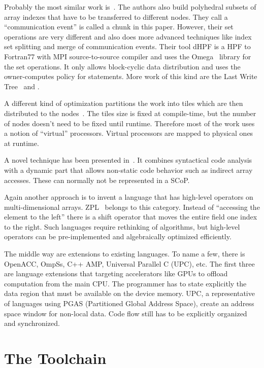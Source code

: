 \documentclass{sigplanconf}
\newcommand{\dquote}[1]{``#1''}
\begin{document}
Probably the most similar work is~\cite{adve98}. The authors also build polyhedral subsets of array indexes that have to be transferred to different nodes. They call a \dquote{communication event} is called a chunk in this paper. However, their set operations are very different and also does more advanced techniques like index set splitting and merge of communication events. Their tool dHPF is a HPF to Fortran77 with MPI source-to-source compiler and uses the Omega~\cite{omega} library for the set operations. It only allows block-cyclic data distribution and uses the owner-computes policy for statements. More work of this kind are the Last Write Tree~\cite{amarasinghe93} and \cite{dathathri13}.

A different kind of optimization partitions the work into tiles which are then distributed to the nodes~\cite{bondhugula11,classen06,yuki13}. The tiles size is fixed at compile-time, but the number of nodes doesn't need to be fixed until runtime. Therefore most of the work uses a notion of \dquote{virtual} processors. Virtual processors are mapped to physical ones at runtime.

A novel technique has been presented in~\cite{ravishankar12}. It combines syntactical code analysis with a dynamic part that allows non-static code behavior such as indirect array accesses. These can normally not be represented in a SCoP.

Again another approach is to invent a language that has high-level operators on multi-dimensional arrays. ZPL~\cite{snyder99} belongs to this category. Instead of \dquote{accessing the element to the left} there is a shift operator that moves the entire field one index to the right. Such languages require rethinking of algorithms, but high-level operators can be pre-implemented and algebraically optimized efficiently.

The middle way are extensions to existing languages. To name a few, there is OpenACC, OmpSs, C++ AMP, Universal Parallel C (UPC), etc. The first three are language extensions that targeting accelerators like GPUs to offload computation from the main CPU. The programmer has to state explicitly the data region that must be available on the device memory. UPC, a representative of languages using PGAS (Partitioned Global Address Space), create an address space window for non-local data. Code flow still has to be explicitly organized and synchronized.




\section{The Toolchain}\label{sct:toolchain}
\end{document}
